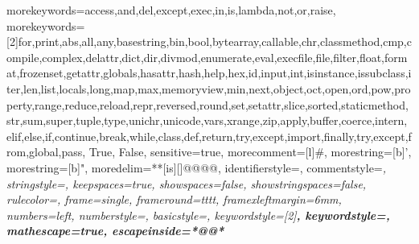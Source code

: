 \usepackage{xcolor}

\newcommand\Pdef{P_{\text{def}}}
\newcommand\Psur{P_{\text{sur}}}
\newcommand\cov{\text{Cov}}
\newcommand\var{\text{Var}}

\usepackage{hyperref}
\hypersetup{
	breaklinks=true,  %
	colorlinks=true,
	urlcolor=rahmen,
	linkcolor=rahmen,
	citecolor=rahmen,
}
\hypersetup{linkcolor=rahmen}

\providecommand{\tightlist}{\setlength{\itemsep}{0pt}\setlength{\parskip}{0pt}}

\usepackage{subfig} %

\usepackage{cprotect}
 {
	morekeywords={access,and,del,except,exec,in,is,lambda,not,or,raise},
	morekeywords=[2]{for,print,abs,all,any,basestring,bin,bool,bytearray,callable,chr,classmethod,cmp,compile,complex,delattr,dict,dir,divmod,enumerate,eval,execfile,file,filter,float,format,frozenset,getattr,globals,hasattr,hash,help,hex,id,input,int,isinstance,issubclass,iter,len,list,locals,long,map,max,memoryview,min,next,object,oct,open,ord,pow,property,range,reduce,reload,repr,reversed,round,set,setattr,slice,sorted,staticmethod,str,sum,super,tuple,type,unichr,unicode,vars,xrange,zip,apply,buffer,coerce,intern,elif,else,if,continue,break,while,class,def,return,try,except,import,finally,try,except,from,global,pass, True, False},
	sensitive=true,
	morecomment=[l]\#,
	morestring=[b]',
	morestring=[b]",
	moredelim=**[is][\color{black}]{@@}{@@},
	identifierstyle=\color{black}\footnotesize\ttfamily,
    commentstyle=\color{ipython-cyan}\footnotesize\itshape\ttfamily,
	stringstyle=\color{ipython-red}\footnotesize\ttfamily,
	keepspaces=true,
	showspaces=false,
    showstringspaces=false,
	rulecolor=\color{ipython-frame},
	frame=single,
	frameround={t}{t}{t}{t},
	framexleftmargin=6mm,
	numbers=left,
	numberstyle=\color{black},
	basicstyle=\footnotesize\ttfamily,
	keywordstyle=[2]\color{ipython-green}\bfseries\footnotesize\ttfamily, 
	keywordstyle=\color{ipython-purple}\bfseries\footnotesize\ttfamily,
	mathescape=true,
	escapeinside={*@}{@*}
}

